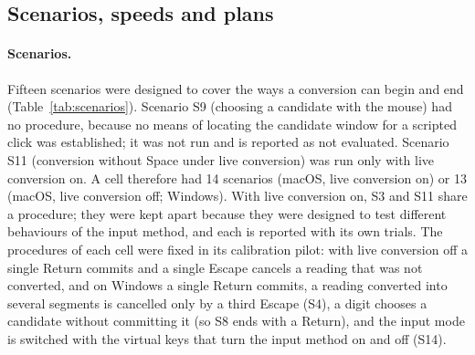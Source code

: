 \subsection{Scenarios, speeds and plans}
\label{sec:method-plans}

\paragraph{Scenarios.} Fifteen scenarios were designed to cover the ways a conversion can begin and end
(Table~\ref{tab:scenarios}). Scenario S9 (choosing a candidate with the mouse) had no procedure, because no means of
locating the candidate window for a scripted click was established; it was not run and is reported as not evaluated.
Scenario S11 (conversion without Space under live conversion) was run only with live conversion on. A cell therefore
had 14 scenarios (macOS, live conversion on) or 13 (macOS, live conversion off; Windows). With live conversion on, S3
and S11 share a procedure; they were kept apart because they were designed to test different behaviours of the input
method, and each is reported with its own trials. The procedures of each cell were fixed in its calibration pilot: with
live conversion off a single Return commits and a single Escape cancels a reading that was not converted, and on
Windows a single Return commits, a reading converted into several segments is cancelled only by a third Escape (S4),
a digit chooses a candidate without committing it (so S8 ends with a Return), and the input mode is switched with the
virtual keys that turn the input method on and off (S14).


